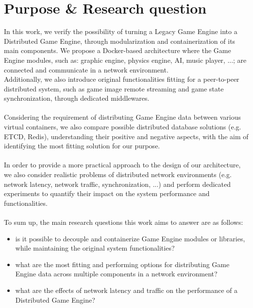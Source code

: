 \section{Purpose \& Research question}
In this work, we verify the possibility of turning a Legacy Game Engine into a Distributed Game Engine, through modularization and containerization of its main components. We propose a Docker-based architecture where the Game Engine modules, such as: graphic engine, physics engine, AI, music player, ...; are connected and communicate in a network environment. \\
Additionally, we also introduce original functionalities fitting for a peer-to-peer distributed system, such as game image remote streaming and game state synchronization, through dedicated middlewares. \\ \\
Considering the requirement of distributing Game Engine data between various virtual containers, we also compare possible distributed database solutions (e.g. ETCD, Redis), understanding their positive and negative aspects, with the aim of identifying the most fitting solution for our purpose. \\ \\
In order to provide a more practical approach to the design of our architecture, we also consider realistic problems of distributed network environments (e.g. network latency, network traffic, synchronization, ...) and perform dedicated experiments to quantify their impact on the system performance and functionalities. \\ \\
To sum up, the main research questions this work aims to answer are as follows:
\begin{itemize}
	\item is it possible to decouple and containerize Game Engine modules or libraries, while maintaining the original system functionalities?
	\item what are the most fitting and performing options for distributing Game Engine data across multiple components in a network environment?
	\item what are the effects of network latency and traffic on the performance of a Distributed Game Engine?
\end{itemize}

